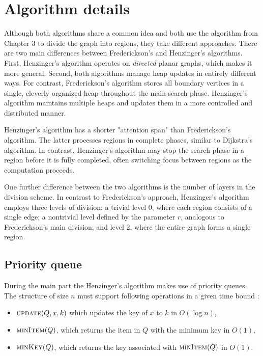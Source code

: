 \section{Algorithm details}
Although both algorithms share a common idea and both use the algorithm from Chapter 3 to divide the graph into regions, they take different approaches. There are two main differences between Frederickson's and Henzinger's algorithms. First, Henzinger's algorithm operates on \emph{directed} planar graphs, which makes it more general. Second, both algorithms manage heap updates in entirely different ways. For contrast, Frederickson's algorithm stores all boundary vertices in a single, cleverly organized heap throughout the main search phase. Henzinger's algorithm maintains multiple heaps and updates them in a more controlled and distributed manner.

Henzinger's algorithm has a shorter "attention span" than Frederickson's algorithm. The latter processes regions in complete phases, similar to Dijkstra's algorithm. In contrast, Henzinger's algorithm may stop the search phase in a region before it is fully completed, often switching focus between regions as the computation proceeds.

One further difference between the two algorithms is the number of layers in the division scheme. In contrast to Frederickson's approach, Henzinger's algorithm employs three levels of division: a trivial level 0, where each region consists of a single edge; a nontrivial level defined by the parameter $r$, analogous to Frederickson’s main division; and level 2, where the entire graph forms a single region.

\subsection{Priority queue}
During the main part the Henzinger's algorithm makes use of priority queues. The structure of size $n$ must support following operations in a given time bound \cite{henzinger}:
\begin{itemize}
    \item $\textsc{update}(Q, x, k)$ which updates the key of $x$ to $k$ in $O(\log n)$,
    \item $\textsc{minItem}(Q)$, which returns the item in $Q$ with the minimum key in $O(1)$,
    \item $\textsc{minKey}(Q)$, which returns the key associated with $\textsc{minItem}(Q)$ in $O(1)$.
\end{itemize}


